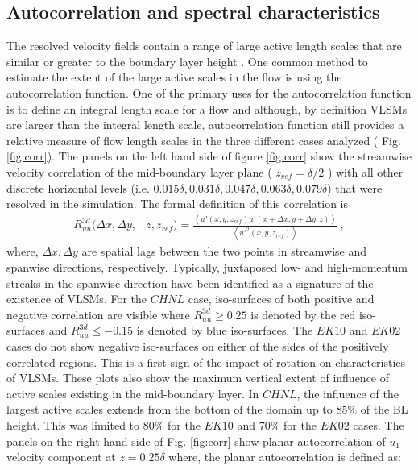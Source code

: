 \documentclass{amsart}
\begin{document}
\subsection{Autocorrelation and spectral characteristics}
The resolved velocity fields contain a  range of large active length scales that are similar or greater to the boundary layer height \citep{}. One common method to estimate the extent of the large active scales in the flow is using the autocorrelation function. One of the primary uses for the autocorrelation function is to define an integral length scale for a flow and although, by definition VLSMs are larger than the integral length scale,  autocorrelation function still provides a relative measure of flow length scales in the three different cases analyzed ( Fig. \ref{fig:corr}). The panels on the left hand side of figure \ref{fig:corr} show the streamwise velocity correlation of the mid-boundary layer plane ( $z_{ref}=\delta/2$ ) with all other discrete horizontal levels (i.e. $ 0.015\delta, 0.031\delta, 0.047\delta, 0.063\delta, 0.079\delta$) that were resolved in the simulation. The formal definition of this correlation is 
\begin{align}
 R_{uu}^{3d}(\Delta x, \Delta y, & z, z_{ref})   =   \frac{\left < u'(x, y, z_{ref})u'(x+ \Delta x, y + \Delta y, z) \right >}{\left < u'^{2}(x,y,z_{ref})\right >} \ ,
\label{eqn:3d_corr} 
\end{align}
where, $\Delta x, \Delta y$ are spatial lags between the two points in streamwise and spanwise directions, respectively. Typically,  juxtaposed low- and high-momentum streaks  in the spanwise direction have been identified as a signature of the existence of VLSMs. For the $CHNL$ case, iso-surfaces of both positive and negative correlation are visible where $R_{uu}^{3d}\geq 0.25$ is denoted by the red iso-surfaces and $R_{uu}^{3d}\leq -0.15$ is denoted by blue iso-surfaces. The $EK10$ and $EK02$ cases do not show negative iso-surfaces on either of the sides of the positively correlated regions. This is a  first sign of the impact of rotation on characteristics of VLSMs. These plots also show the maximum vertical extent of influence of active scales existing in the mid-boundary layer. In $CHNL$, the influence of the largest active scales extends from the bottom of the domain up to   $85\%$ of the BL height. This was limited to $80\%$ for the $EK10$ and $70\%$ for the $EK02$ cases.  The panels on the right hand side of Fig. \ref{fig:corr} show planar autocorrelation of $u_1$-velocity component at $ z=0.25\delta$ where, the planar autocorrelation is defined as: 
\end{document}
